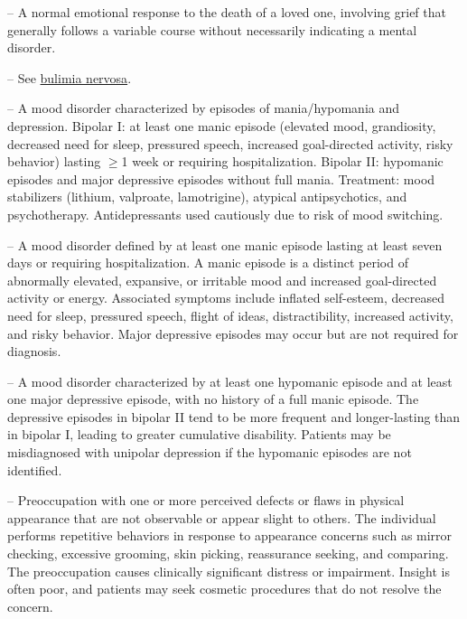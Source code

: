 -- A normal emotional response to the death of a loved one, involving grief that generally follows a variable course without necessarily indicating a mental disorder.

-- See \hyperlink{Bulimia Nervosa}{bulimia nervosa}.

-- A mood disorder characterized by episodes of mania/hypomania and depression. Bipolar I: at least one manic episode (elevated mood, grandiosity, decreased need for sleep, pressured speech, increased goal-directed activity, risky behavior) lasting \(\ge\)1 week or requiring hospitalization. Bipolar II: hypomanic episodes and major depressive episodes without full mania. Treatment: mood stabilizers (lithium, valproate, lamotrigine), atypical antipsychotics, and psychotherapy. Antidepressants used cautiously due to risk of mood switching.

-- A mood disorder defined by at least one manic episode lasting at least seven days or requiring hospitalization. A manic episode is a distinct period of abnormally elevated, expansive, or irritable mood and increased goal-directed activity or energy. Associated symptoms include inflated self-esteem, decreased need for sleep, pressured speech, flight of ideas, distractibility, increased activity, and risky behavior. Major depressive episodes may occur but are not required for diagnosis.

-- A mood disorder characterized by at least one hypomanic episode and at least one major depressive episode, with no history of a full manic episode. The depressive episodes in bipolar II tend to be more frequent and longer-lasting than in bipolar I, leading to greater cumulative disability. Patients may be misdiagnosed with unipolar depression if the hypomanic episodes are not identified.

-- Preoccupation with one or more perceived defects or flaws in physical appearance that are not observable or appear slight to others. The individual performs repetitive behaviors in response to appearance concerns such as mirror checking, excessive grooming, skin picking, reassurance seeking, and comparing. The preoccupation causes clinically significant distress or impairment. Insight is often poor, and patients may seek cosmetic procedures that do not resolve the concern.

